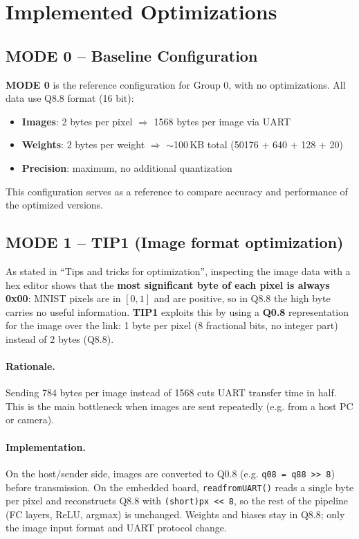 \documentclass[11pt,a4paper]{article}
\begin{document}
\section{Implemented Optimizations}

\subsection{MODE 0 -- Baseline Configuration}

\textbf{MODE 0} is the reference configuration for Group 0, with no optimizations. All data use Q8.8 format (16 bit):
\begin{itemize}
    \item \textbf{Images}: 2 bytes per pixel $\Rightarrow$ 1568 bytes per image via UART
    \item \textbf{Weights}: 2 bytes per weight $\Rightarrow$ $\sim$100\,KB total (50176 + 640 + 128 + 20)
    \item \textbf{Precision}: maximum, no additional quantization
\end{itemize}
This configuration serves as a reference to compare accuracy and performance of the optimized versions.

\subsection{MODE 1 -- TIP1 (Image format optimization)}

As stated in ``Tips and tricks for optimization'', inspecting the image data with a hex editor shows that the \textbf{most significant byte of each pixel is always 0x00}: MNIST pixels are in $[0,1]$ and are positive, so in Q8.8 the high byte carries no useful information. \textbf{TIP1} exploits this by using a \textbf{Q0.8} representation for the image over the link: 1 byte per pixel (8 fractional bits, no integer part) instead of 2 bytes (Q8.8).

\paragraph{Rationale.} Sending 784 bytes per image instead of 1568 cuts UART transfer time in half. This is the main bottleneck when images are sent repeatedly (e.g. from a host PC or camera).

\paragraph{Implementation.} On the host/sender side, images are converted to Q0.8 (e.g. \texttt{q08 = q88 >> 8}) before transmission. On the embedded board, \texttt{readfromUART()} reads a single byte per pixel and reconstructs Q8.8 with \texttt{(short)px << 8}, so the rest of the pipeline (FC layers, ReLU, argmax) is unchanged. Weights and biases stay in Q8.8; only the image input format and UART protocol change.
\end{document}
